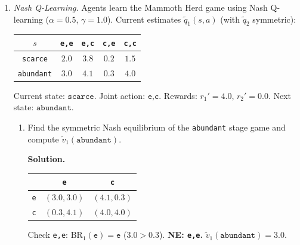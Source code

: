 \documentclass[12pt]{article}
\newenvironment{solution}{%
  \ifshowsolutions\begin{solutionbox}\noindent\textbf{\color{blue!70!black}Solution.}\quad\fi
  \ifshowsolutions\else\expandafter\comment\fi
}{%
  \ifshowsolutions\end{solutionbox}\fi
  \ifshowsolutions\else\expandafter\endcomment\fi
}
\begin{document}
\begin{enumerate}
\begin{enumerate}
  \item Compare equilibria at $t=0$ and $t=1$. Does the equilibrium action change?

  \begin{solution}
    The equilibrium is \texttt{e,e} in both states at both time steps. It does not change. Intuitively, the immediate temptation to exploit (\texttt{e,c} yields $4.0 > 0.8$) dominates regardless of future state values, because neither agent can unilaterally benefit from switching to \texttt{c}. A longer horizon or stronger future consequences (larger $\gamma$ with a payoff structure favoring \texttt{c,c} more heavily) would be needed to shift the equilibrium.
  \end{solution}
\end{enumerate}

\clearpage

\item \textit{Nash Q-Learning.}
Agents learn the Mammoth Herd game using Nash Q-learning ($\alpha=0.5$, $\gamma=1.0$). Current estimates $\tilde{q}_1(s,a)$ (with $\tilde{q}_2$ symmetric):
\begin{table}[H]
  \centering
  \begin{tabular}{|c|c|c|c|c|}
    \hline
    $s$ & \texttt{e,e} & \texttt{e,c} & \texttt{c,e} & \texttt{c,c} \\\hline
    \texttt{scarce}   & $2.0$ & $3.8$ & $0.2$ & $1.5$ \\\hline
    \texttt{abundant} & $3.0$ & $4.1$ & $0.3$ & $4.0$ \\\hline
  \end{tabular}
\end{table}
Current state: $\texttt{scarce}$. Joint action: $\texttt{e,c}$. Rewards: $r_1'=4.0$, $r_2'=0.0$. Next state: $\texttt{abundant}$.

\begin{enumerate}
  \item Find the symmetric Nash equilibrium of the \texttt{abundant} stage game and compute $\tilde{v}_1(\texttt{abundant})$.

  \begin{solution}
    \begin{center}\begin{tabular}{|c|c|c|}\hline & \texttt{e} & \texttt{c}\\\hline \texttt{e} & $(3.0,3.0)$ & $(4.1,0.3)$\\\hline \texttt{c} & $(0.3,4.1)$ & $(4.0,4.0)$\\\hline\end{tabular}\end{center}
    Check \texttt{e,e}: $\mathrm{BR}_1(\texttt{e})=\texttt{e}$ ($3.0>0.3$). \textbf{NE: \texttt{e,e}.} $\tilde{v}_1(\texttt{abundant})=3.0$.


\end{solution}
\end{enumerate}
\end{enumerate}
\end{document}
